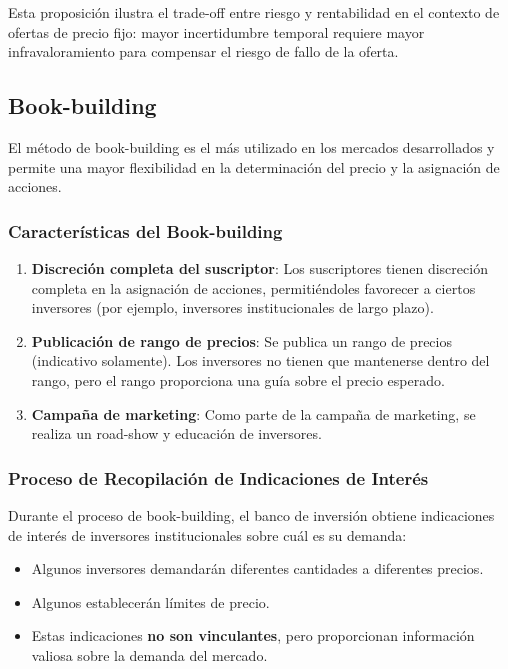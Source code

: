 Esta proposición ilustra el trade-off entre riesgo y rentabilidad en el contexto de ofertas de precio fijo: mayor incertidumbre temporal requiere mayor infravaloramiento para compensar el riesgo de fallo de la oferta.

\subsection{Book-building}

El método de book-building es el más utilizado en los mercados desarrollados y permite una mayor flexibilidad en la determinación del precio y la asignación de acciones.

\subsubsection{Características del Book-building}

\begin{enumerate}
\item \textbf{Discreción completa del suscriptor}: Los suscriptores tienen discreción completa en la asignación de acciones, permitiéndoles favorecer a ciertos inversores (por ejemplo, inversores institucionales de largo plazo).
\item \textbf{Publicación de rango de precios}: Se publica un rango de precios (indicativo solamente). Los inversores no tienen que mantenerse dentro del rango, pero el rango proporciona una guía sobre el precio esperado.
\item \textbf{Campaña de marketing}: Como parte de la campaña de marketing, se realiza un road-show y educación de inversores.
\end{enumerate}

\subsubsection{Proceso de Recopilación de Indicaciones de Interés}

Durante el proceso de book-building, el banco de inversión obtiene indicaciones de interés de inversores institucionales sobre cuál es su demanda:

\begin{itemize}
\item Algunos inversores demandarán diferentes cantidades a diferentes precios.
\item Algunos establecerán límites de precio.
\item Estas indicaciones \textbf{no son vinculantes}, pero proporcionan información valiosa sobre la demanda del mercado.
\end{itemize}

